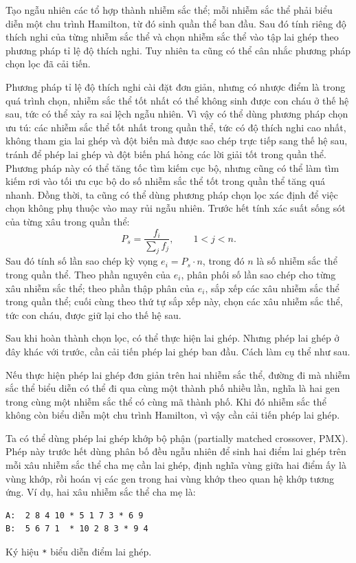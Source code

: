 \documentclass[11pt]{article}
\begin{document}
Tạo ngẫu nhiên các tổ hợp thành nhiễm sắc thể; mỗi nhiễm sắc thể phải biểu
diễn một chu trình Hamilton, từ đó sinh quần thể ban đầu. Sau đó tính riêng
độ thích nghi của từng nhiễm sắc thể và chọn nhiễm sắc thể vào tập lai ghép
theo phương pháp tỉ lệ độ thích nghi. Tuy nhiên ta cũng có thể cân nhắc
phương pháp chọn lọc đã cải tiến.

Phương pháp tỉ lệ độ thích nghi cài đặt đơn giản, nhưng có nhược điểm là
trong quá trình chọn, nhiễm sắc thể tốt nhất có thể không sinh được con cháu
ở thế hệ sau, tức có thể xảy ra sai lệch ngẫu nhiên. Vì vậy có thể dùng
phương pháp chọn ưu tú: các nhiễm sắc thể tốt nhất trong quần thể, tức có độ
thích nghi cao nhất, không tham gia lai ghép và đột biến mà được sao chép
trực tiếp sang thế hệ sau, tránh để phép lai ghép và đột biến phá hỏng các
lời giải tốt trong quần thể. Phương pháp này có thể tăng tốc tìm kiếm cục
bộ, nhưng cũng có thể làm tìm kiếm rơi vào tối ưu cục bộ do số nhiễm sắc thể
tốt trong quần thể tăng quá nhanh. Đồng thời, ta cũng có thể dùng phương pháp
chọn lọc xác định để việc chọn không phụ thuộc vào may rủi ngẫu nhiên. Trước
hết tính xác suất sống sót của từng xâu trong quần thể:
\[
  P_s=\frac{f_i}{\sum_j f_j},\qquad 1<j<n.
\]
Sau đó tính số lần sao chép kỳ vọng \(e_i=P_s\cdot n\), trong đó \(n\) là số
nhiễm sắc thể trong quần thể. Theo phần nguyên của \(e_i\), phân phối số lần
sao chép cho từng xâu nhiễm sắc thể; theo phần thập phân của \(e_i\), sắp
xếp các xâu nhiễm sắc thể trong quần thể; cuối cùng theo thứ tự sắp xếp này,
chọn các xâu nhiễm sắc thể, tức con cháu, được giữ lại cho thế hệ sau.

Sau khi hoàn thành chọn lọc, có thể thực hiện lai ghép. Nhưng phép lai ghép ở
đây khác với trước, cần cải tiến phép lai ghép ban đầu. Cách làm cụ thể như
sau.

Nếu thực hiện phép lai ghép đơn giản trên hai nhiễm sắc thể, đường đi mà
nhiễm sắc thể biểu diễn có thể đi qua cùng một thành phố nhiều lần, nghĩa là
hai gen trong cùng một nhiễm sắc thể có cùng mã thành phố. Khi đó nhiễm sắc
thể không còn biểu diễn một chu trình Hamilton, vì vậy cần cải tiến phép lai
ghép.

Ta có thể dùng phép lai ghép khớp bộ phận (partially matched crossover, PMX).
Phép này trước hết dùng phân bố đều ngẫu nhiên để sinh hai điểm lai ghép
trên mỗi xâu nhiễm sắc thể cha mẹ cần lai ghép, định nghĩa vùng giữa hai
điểm ấy là vùng khớp, rồi hoán vị các gen trong hai vùng khớp theo quan hệ
khớp tương ứng. Ví dụ, hai xâu nhiễm sắc thể cha mẹ là:
\begin{verbatim}
A:  2 8 4 10 * 5 1 7 3 * 6 9
B:  5 6 7 1  * 10 2 8 3 * 9 4
\end{verbatim}
Ký hiệu \texttt{*} biểu diễn điểm lai ghép.
\end{document}

